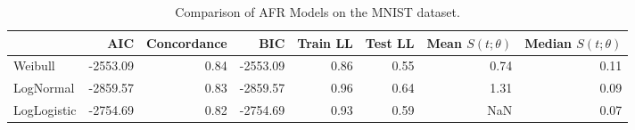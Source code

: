 \begin{table}
\caption{Comparison of AFR Models on the MNIST dataset.}
\label{tab:mnist}
\begin{tabular}{lrrrrrrr}
\toprule
 & AIC & Concordance & BIC & Train LL & Test LL & Mean $S(t;\theta)$ & Median $S(t;\theta)$ \\
\midrule
Weibull & -2553.09 & 0.84 & -2553.09 & 0.86 & 0.55 & 0.74 & 0.11 \\
LogNormal & -2859.57 & 0.83 & -2859.57 & 0.96 & 0.64 & 1.31 & 0.09 \\
LogLogistic & -2754.69 & 0.82 & -2754.69 & 0.93 & 0.59 & NaN & 0.07 \\
\bottomrule
\end{tabular}
\end{table}
